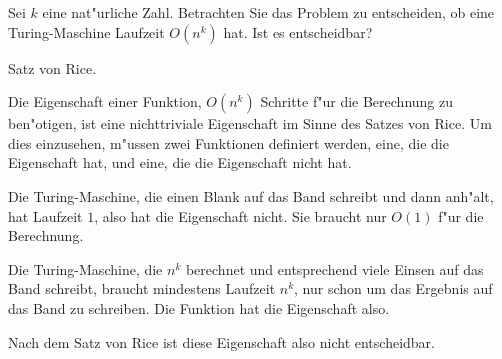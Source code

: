 Sei $k$ eine nat"urliche Zahl.
Betrachten Sie das Problem zu entscheiden, ob eine Turing-Maschine
Laufzeit $O(n^k)$ hat. Ist es entscheidbar?

\begin{hinweis}
Satz von Rice.
\end{hinweis}

\begin{loesung}
Die Eigenschaft einer Funktion, $O(n^k)$ Schritte f"ur die Berechnung zu
ben"otigen, ist eine nichttriviale Eigenschaft im Sinne des Satzes von Rice.
Um dies einzusehen, m"ussen zwei Funktionen definiert werden, eine,
die die Eigenschaft hat, und eine, die die Eigenschaft nicht hat.

Die Turing-Maschine, die einen Blank auf das Band schreibt und dann anh"alt,
hat Laufzeit $1$, also hat die Eigenschaft nicht. Sie braucht nur $O(1)$
f"ur die Berechnung.

Die Turing-Maschine, die $n^k$ berechnet und entsprechend viele
Einsen auf das Band schreibt, braucht mindestens Laufzeit $n^k$, nur
schon um das Ergebnis auf das Band zu schreiben. Die Funktion hat die
Eigenschaft also.

Nach dem Satz von Rice ist diese Eigenschaft also nicht entscheidbar.
\end{loesung}
